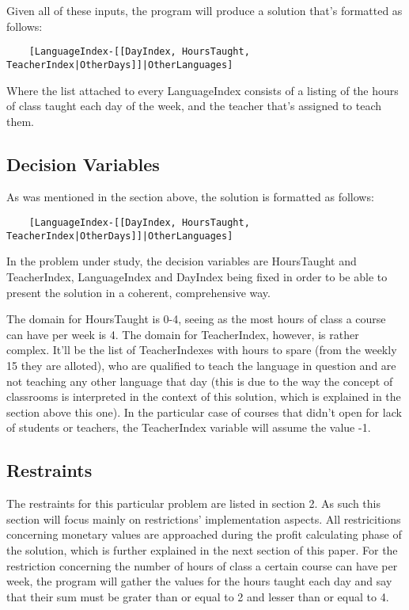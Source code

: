 \documentclass{llncs}
\begin{document}
Given all of these inputs, the program will produce a solution that's formatted as follows:
\begin{verbatim}
	[LanguageIndex-[[DayIndex, HoursTaught, TeacherIndex|OtherDays]]|OtherLanguages]
\end{verbatim}

Where the list attached to every LanguageIndex consists of a listing of the hours of class taught each day of the week, and the teacher that's assigned to teach them.

\subsection{Decision Variables}
As was mentioned in the section above, the solution is formatted as follows:
\begin{verbatim}
	[LanguageIndex-[[DayIndex, HoursTaught, TeacherIndex|OtherDays]]|OtherLanguages]
\end{verbatim}

In the problem under study, the decision variables are HoursTaught and TeacherIndex, LanguageIndex and DayIndex being fixed in order to be able to present the solution in a coherent, comprehensive way.

The domain for HoursTaught is 0-4, seeing as the most hours of class a course can have per week is 4. The domain for TeacherIndex, however, is rather complex. It'll be the list of  TeacherIndexes with hours to spare (from the weekly 15 they are alloted), who are qualified to teach the language in question and are not teaching any other language that day (this is due to the way the concept of classrooms is interpreted in the context of this solution, which is explained in the section above this one). In the particular case of courses that didn't open for lack of students or teachers, the TeacherIndex variable will assume the value -1.

\subsection{Restraints}
The restraints for this particular problem are listed in section 2. As such this section will focus mainly on restrictions' implementation aspects. All restricitions concerning monetary values are approached during the profit calculating phase of the solution, which is further explained in the next section of this paper. For the restriction concerning the number of hours of class a certain course can have per week, the program will gather the values for the hours taught each day and say that their sum must be grater than or equal to 2 and lesser than or equal to 4. 
\end{document}
